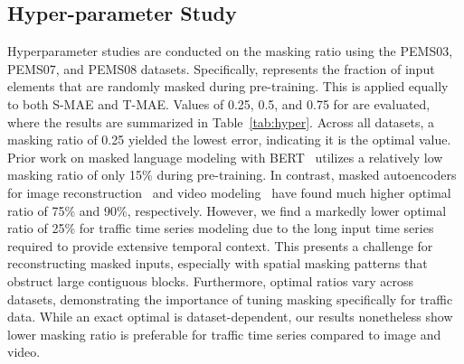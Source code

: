 \documentclass[letterpaper]{article} \usepackage{aaai24}  \usepackage{times}  \usepackage{helvet}  \usepackage{courier}  \usepackage[hyphens]{url}  \usepackage{graphicx} \urlstyle{rm} \def\UrlFont{\rm}  \usepackage{natbib}  \usepackage{caption} \frenchspacing  \setlength{\pdfpagewidth}{8.5in} \setlength{\pdfpageheight}{11in} \usepackage{algorithm}
\begin{document}
\subsection{Hyper-parameter Study}
\begin{table}[h] \renewcommand\arraystretch{1.2}
    \footnotesize
    \centering
     \captionsetup{justification=centering}
	\caption{Hyper-parameter Study on Masking Ratio }
	\label{tab:hyper}
\end{table}
Hyperparameter studies are conducted on the masking ratio  using the PEMS03, PEMS07, and PEMS08 datasets. Specifically,  represents the fraction of input elements that are randomly masked during pre-training. This is applied equally to both S-MAE and T-MAE. Values of 0.25, 0.5, and 0.75 for  are evaluated, where the results are summarized in Table~\ref{tab:hyper}.
Across all datasets, a masking ratio of 0.25 yielded the lowest error, indicating it is the optimal value. Prior work on masked language modeling with BERT~\cite{devlin2018bert} utilizes a relatively low masking ratio of only 15\% during pre-training. In contrast, masked autoencoders for image reconstruction~\cite{he2022masked} and video modeling~\cite{tong2022videomae} have found much higher optimal ratio of 75\% and 90\%, respectively. However, we find a markedly lower optimal ratio of 25\% for traffic time series modeling due to the long input time series required to provide extensive temporal context. This presents a challenge for reconstructing masked inputs, especially with spatial masking patterns that obstruct large contiguous blocks. Furthermore, optimal ratios vary across datasets, demonstrating the importance of tuning masking specifically for traffic data. While an exact optimal is dataset-dependent, our results nonetheless show lower masking ratio is preferable for traffic time series compared to image and video.
\end{document}

